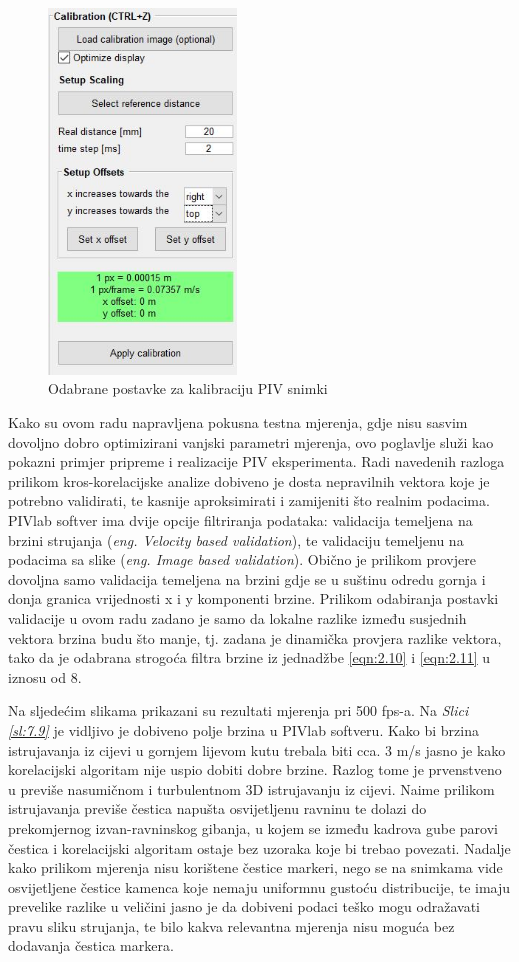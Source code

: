 \begin{description}[style=unboxed,leftmargin=0cm]
\begin{figure}[h]
		\includegraphics[width=5cm]{./7_LowCostPIV/slika7_8.jpg} 
		\caption{Odabrane postavke za kalibraciju PIV snimki}
		\label{sl:7.8}
	\end{figure}
	\item[Validacija dobivenih podataka] Kako su ovom radu napravljena pokusna testna mjerenja, gdje nisu sasvim dovoljno dobro optimizirani vanjski parametri mjerenja, ovo poglavlje služi kao pokazni primjer pripreme i realizacije PIV eksperimenta. Radi navedenih razloga prilikom kros-korelacijske analize dobiveno je dosta nepravilnih vektora koje je potrebno validirati, te kasnije aproksimirati i zamijeniti što realnim podacima. PIVlab softver ima dvije opcije filtriranja podataka: validacija temeljena na brzini strujanja (\textit{eng. Velocity based validation}), te validaciju temeljenu na podacima sa slike (\textit{eng. Image based validation}). Obično je prilikom provjere dovoljna samo validacija temeljena na brzini gdje se u suštinu odredu gornja i donja granica vrijednosti x i y komponenti brzine. Prilikom odabiranja postavki validacije u ovom radu zadano je samo da lokalne razlike između susjednih vektora brzina budu što manje, tj. zadana je dinamička provjera razlike vektora, tako da je odabrana strogoća filtra brzine iz jednadžbe \ref{eqn:2.10} i \ref{eqn:2.11} u iznosu od 8.
\end{description}
Na sljedećim slikama prikazani su rezultati mjerenja pri 500 fps-a. Na \textit{Slici \ref{sl:7.9}} je vidljivo je dobiveno polje brzina u PIVlab softveru. Kako bi brzina istrujavanja iz cijevi u gornjem lijevom kutu trebala biti cca. 3 m/s jasno je kako korelacijski algoritam nije uspio dobiti dobre brzine. Razlog tome je prvenstveno u previše nasumičnom i turbulentnom 3D istrujavanju iz cijevi. Naime prilikom istrujavanja previše čestica napušta osvijetljenu ravninu te dolazi do prekomjernog izvan-ravninskog gibanja, u kojem se između kadrova gube parovi čestica i korelacijski algoritam ostaje bez uzoraka koje bi trebao povezati. Nadalje kako prilikom mjerenja nisu korištene čestice markeri, nego se na snimkama vide osvijetljene čestice kamenca koje nemaju uniformnu gustoću distribucije, te imaju prevelike razlike u veličini jasno je da dobiveni podaci teško mogu odražavati pravu sliku strujanja, te bilo kakva relevantna mjerenja nisu moguća bez dodavanja čestica markera.
